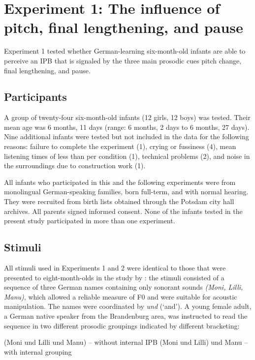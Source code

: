 \documentclass[output=paper]{langscibook}
\begin{document}


\section{Experiment 1: The influence of pitch, final lengthening, and pause}
Experiment 1 tested whether German-learning six-month-old infants are able to perceive an IPB that is signaled by the three main prosodic cues pitch change, final lengthening, and pause.

\subsection{Participants}
A group of twenty-four six-month-old infants (12 girls, 12 boys) was tested. Their mean age was 6 months, 11 days (range: 6 months, 2 days to 6 months, 27 days). Nine additional infants were tested but not included in the data for the following reasons: failure to complete the experiment (1), crying or fussiness (4), mean listening times of less than  per condition (1), technical problems (2), and noise in the surroundings due to construction work (1).

All infants who participated in this and the following experiments were from monolingual German-speaking families, born full-term, and with normal hearing. They were recruited from birth lists obtained through the Potsdam city hall archives. All parents signed informed consent. None of the infants tested in the present study participated in more than one experiment.

\subsection{Stimuli}
All stimuli used in Experiments 1 and 2 were identical to those that were presented to eight-month-olds in the study by \citet{Wellmann2012}: the stimuli consisted of a sequence of three German names containing only sonorant sounds \textit{(Moni, Lilli, Manu)}, which allowed a reliable measure of F0 and were suitable for acoustic manipulation. The names were coordinated by \textit{und} (‘and’). A young female adult, a German native speaker from the Brandenburg area, was instructed to read the sequence in two different prosodic groupings indicated by different bracketing:

\ea (Moni und Lilli und Manu) -- without internal IPB
\ex (Moni und Lilli) und Manu -- with internal grouping
\z
\end{document}
